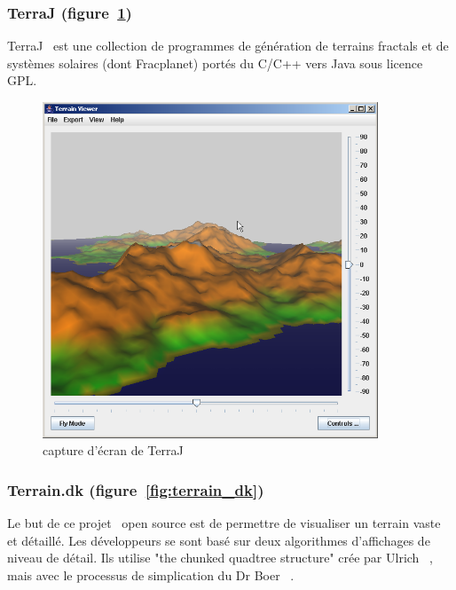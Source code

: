 \subsubsection{TerraJ (figure~\ref{fig:terraj})}
TerraJ~\cite{TerraJ} est une collection de programmes de génération de terrains fractals et de systèmes solaires (dont Fracplanet) portés du C/C++ vers Java sous licence GPL.

\begin{figure}[!ht]
    \begin{center}
        \includegraphics[width=10cm]{resources/terraj.png}
        \caption{capture d'écran de TerraJ}
        \label{fig:terraj}
    \end{center}
\end{figure}

\subsubsection{Terrain.dk (figure~\ref{fig:terrain_dk})}
Le but de ce projet~\cite{largeDetTerrainsURL} open source est de permettre de
visualiser un terrain vaste et détaillé. Les développeurs se sont basé sur deux algorithmes
d'affichages de niveau de détail. Ils utilise "the chunked quadtree structure"
crée par Ulrich ~\cite{Ulrich2002}, mais avec le processus de simplication du
Dr Boer ~\cite{citeulike:623420}.

